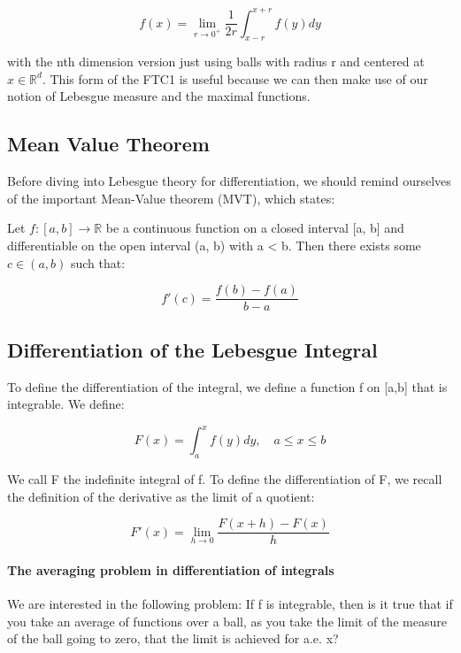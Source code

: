 \documentclass[class=article, crop=false]{standalone}
\begin{document}
		$$f(x) = \lim_{r \rightarrow 0^+} \frac{1}{2r} \int_{x-r}^{x+r} f(y) dy$$

	with the nth dimension version just using balls with radius r and centered at $x \in \mathbb{R}^d$. This form of the FTC1 is useful because we can then make use of our notion of Lebesgue measure and the maximal functions.

	\subsection{Mean Value Theorem}
		Before diving into Lebesgue theory for differentiation, we should remind ourselves of the important Mean-Value theorem (MVT), which states:

		\begin{theorem}
		\label{thm:mvt}
			Let $f: [a, b] \rightarrow \mathbb{R}$ be a continuous function on a closed interval [a, b] and differentiable on the open interval (a, b) with a < b. Then there exists some $c \in (a, b)$ such that:

				$$f'(c) = \frac{f(b) - f(a)}{b - a}$$

		\end{theorem}

	\subsection{Differentiation of the Lebesgue Integral}
		To define the differentiation of the integral, we define a function f on [a,b] that is integrable. We define:

			$$F(x) = \int_a^x f(y) dy, \quad a \le x \le b$$

		We call F the indefinite integral of f. To define the differentiation of F, we recall the definition of the derivative as the limit of a quotient:

			$$F'(x) = \lim_{h \rightarrow 0} \frac{F(x+h) - F(x)}{h}$$

		\paragraph{The averaging problem in differentiation of integrals}
		We are interested in the following problem: If f is integrable, then is it true that if you take an average of functions over a ball, as you take the limit of the measure of the ball going to zero, that the limit is achieved for a.e. x?
\end{document}
